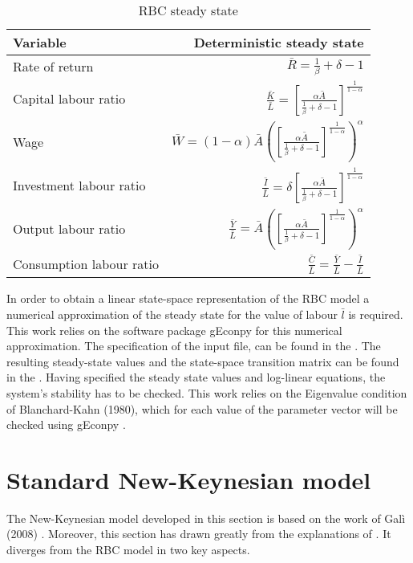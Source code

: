 \documentclass[12pt,a4paper,english]{article} %
\newcommand{\Rss}{\frac{1}{\beta} + \delta - 1}
\newcommand{\Ass}{\bar{A}}
\newcommand{\KLss}{\left[ \frac{\alpha \Ass}{\Rss} \right]^{\frac{1}{1-\alpha}}}
\let\oldsection\section
\renewcommand\section{\clearpage\oldsection}
\begin{document}
	\begin{table}[H]
		\fontsize{9pt}{9pt}\selectfont
		\centering
		\caption{RBC steady state}
		\begin{tabular}{lr}
			\textbf{Variable} & \textbf{Deterministic steady state}\\
			\hline 
			Rate of return & $\bar{R} = \Rss$ \\
			Capital labour ratio & $\frac{\bar{K}}{\bar{L}} = \KLss$ \\
			Wage & $\bar{W} = (1 - \alpha) \Ass \left(\KLss\right)^\alpha$ \\
			Investment labour ratio & $\frac{\bar{I}}{\bar{L}} = \delta \KLss$ \\
			Output labour ratio & $\frac{\bar{Y}}{\bar{L}} = \Ass \left(\KLss\right)^\alpha$ \\
			Consumption labour ratio & $\frac{\bar{C}}{\bar{L}} = \frac{\bar{Y}}{\bar{L}} - \frac{\bar{I}}{\bar{L}}$ \\
		\end{tabular}
	\end{table}

	In order to obtain a linear state-space representation of the RBC model a numerical approximation of the steady state for the value of labour $\bar{l}$ is required. This work relies on the software package gEconpy \cite{jessegrabowski_geconpy_2023} for this numerical approximation. The specification of the input file, can be found in the . The resulting steady-state values and the state-space transition matrix can be found in the . 
	Having specified the steady state values and log-linear equations, the system's stability has to be checked. This work relies on the Eigenvalue condition of Blanchard-Kahn (1980), which for each value of the parameter vector will be checked using gEconpy \cite{blanchard_solution_1980}.

	\section{Standard New-Keynesian model} \label{sec:NK}
	The New-Keynesian model developed in this section is based on the work of Galì (2008) \cite{gali_monetary_2008}. Moreover, this section has drawn greatly from the explanations of \cite{bergholt_basic_2023}. It diverges from the RBC model in two key aspects.
	
\end{document}
